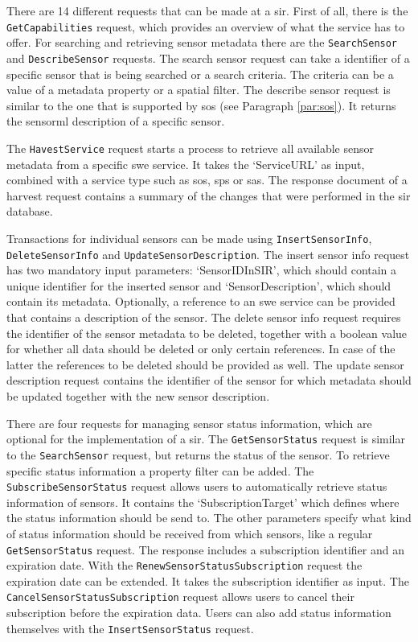 There are 14 different requests that can be made at a \ac{sir}. First of all, there is the \texttt{GetCapabilities} request, which provides an overview of what the service has to offer. For searching and retrieving sensor metadata there are the \texttt{SearchSensor} and \texttt{DescribeSensor} requests. The search sensor request can take a identifier of a specific sensor that is being searched or a search criteria. The criteria can be a value of a metadata property or a spatial filter. The describe sensor request is similar to the one that is supported by \ac{sos} (see Paragraph \ref{par:sos}). It returns the \ac{sensorml} description of a specific sensor. 

The \texttt{HavestService} request starts a process to retrieve all available sensor metadata from a specific \ac{swe} service. It takes the `ServiceURL' as input, combined with a service type such as \ac{sos}, \ac{sps} or \ac{sas}. The response document of a harvest request contains a summary of the changes that were performed in the \ac{sir} database.

Transactions for individual sensors can be made using \texttt{InsertSensorInfo}, \texttt{DeleteSensorInfo}  and \texttt{UpdateSensorDescription}. The insert sensor info request has two mandatory input parameters: `SensorIDInSIR', which should contain a unique identifier for the inserted sensor and `SensorDescription', which should contain its metadata. Optionally, a reference to an \ac{swe} service can be provided that contains a description of the sensor. The delete sensor info request requires the identifier of the sensor metadata to be deleted, together with a boolean value for whether all data should be deleted or only certain references. In case of the latter the references to be deleted should be provided as well. The update sensor description request contains the identifier of the sensor for which metadata should be updated together with the new sensor description. 

\begin{sloppypar}
There are four requests for managing sensor status information, which are optional for the implementation of a \ac{sir}. The \texttt{GetSensorStatus} request is similar to the \texttt{SearchSensor} request, but returns the status of the sensor. To retrieve specific status information a property filter can be added. The \texttt{SubscribeSensorStatus} request allows users to automatically retrieve status information of sensors. It contains the `SubscriptionTarget' which defines where the status information should be send to. The other parameters specify what kind of status information should be received from which sensors, like a regular \texttt{GetSensorStatus} request. The response includes a subscription identifier and an expiration date. With the \texttt{RenewSensorStatusSubscription} request the expiration date can be extended. It takes the subscription identifier as input. The \texttt{CancelSensorStatusSubscription} request allows users to cancel their subscription before the expiration data. Users can also add status information themselves with the \texttt{InsertSensorStatus} request.    
\end{sloppypar}

